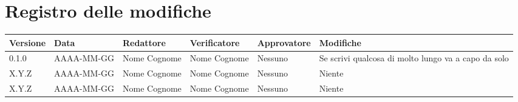 \section*{Registro delle modifiche}

\begin{table}[H]
	\centering
	\fontsize{10}{12}\selectfont
	\begin{tabularx}{\textwidth}{l|l|l|l|l|X}
		\textbf{Versione}     & \textbf{Data}        & \textbf{Redattore} &
		\textbf{Verificatore} & \textbf{Approvatore} & \textbf{Modifiche}                                      \\
		\toprule
		0.1.0                 & AAAA-MM-GG           & Nome Cognome       & Nome Cognome & Nessuno & Se scrivi
		qualcosa di molto lungo va a capo da solo                                                              \\
		X.Y.Z                 & AAAA-MM-GG           & Nome Cognome       & Nome Cognome & Nessuno & Niente    \\
		X.Y.Z                 & AAAA-MM-GG           & Nome Cognome       & Nome Cognome & Nessuno & Niente    \\
		\bottomrule
	\end{tabularx}
\end{table}
